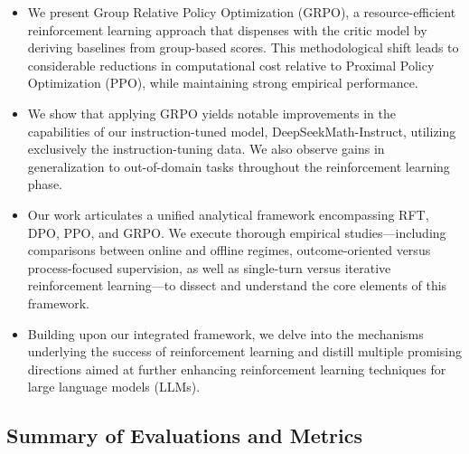 \begin{itemize}[topsep=0pt]
    \item We present Group Relative Policy Optimization (GRPO), a resource-efficient reinforcement learning approach that dispenses with the critic model by deriving baselines from group-based scores. This methodological shift leads to considerable reductions in computational cost relative to Proximal Policy Optimization (PPO), while maintaining strong empirical performance.
    \item We show that applying GRPO yields notable improvements in the capabilities of our instruction-tuned model, DeepSeekMath-Instruct, utilizing exclusively the instruction-tuning data. We also observe gains in generalization to out-of-domain tasks throughout the reinforcement learning phase.
    \item Our work articulates a unified analytical framework encompassing RFT, DPO, PPO, and GRPO. We execute thorough empirical studies—including comparisons between online and offline regimes, outcome-oriented versus process-focused supervision, as well as single-turn versus iterative reinforcement learning—to dissect and understand the core elements of this framework.
    \item Building upon our integrated framework, we delve into the mechanisms underlying the success of reinforcement learning and distill multiple promising directions aimed at further enhancing reinforcement learning techniques for large language models (LLMs).
\end{itemize}

\subsection{Summary of Evaluations and Metrics}

